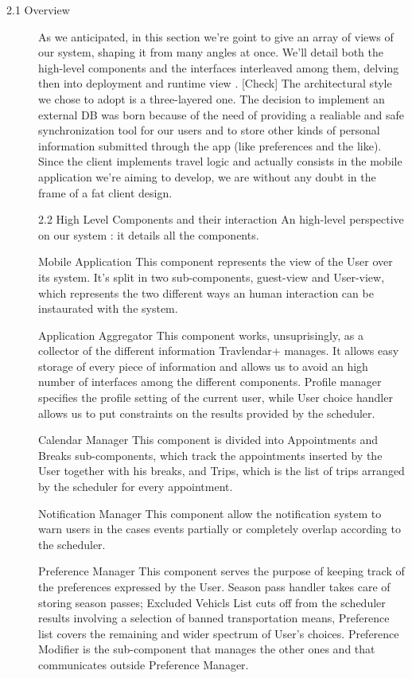 \documentclass[12pt, a4paper]{article}
\begin{document}
\begin{description}

\item[2.1 Overview]
As we anticipated, in this section we’re goint to give an array of views of our system, shaping it from many angles at once. We’ll detail both the high-level components and the interfaces interleaved among them, delving then into deployment and runtime view .
[Check] The architectural style we chose to adopt is a three-layered one.
The decision to implement an external DB was born because of the need of providing a realiable and safe synchronization tool for our users and to store other kinds of personal information submitted through the app (like preferences and the like).
Since the client implements travel logic and actually consists in the mobile application we’re aiming to develop, we are without any doubt in the frame of a fat client design.


2.2 High Level Components and their interaction
An high-level perspective on our system : it details all the components.


Mobile Application
This component represents the view of the User over its system. It’s split in two sub-components, guest-view and User-view, which represents the two different ways an human interaction can be instaurated with the system.

Application Aggregator
This component works, unsuprisingly, as a collector of the different information Travlendar+ manages. It allows easy storage of every piece of information and allows us to avoid an high number of interfaces among the different components. Profile manager specifies the profile setting of the current user, while User choice handler allows us to put constraints on the results provided by the scheduler.
 
Calendar Manager
This component is divided into Appointments and Breaks sub-components, which track the appointments inserted by the User together with his breaks, and Trips, which is the list of trips arranged by the scheduler for every appointment.

Notification Manager
This component allow the notification system to warn users in the cases events partially or completely overlap according to the scheduler.

Preference Manager
This component serves the purpose of keeping track of the preferences expressed by the User. Season pass handler takes care of storing season passes; Excluded Vehicls List cuts off from the scheduler results involving a selection of banned transportation means, Preference list covers the remaining and wider spectrum of User's choices.
Preference Modifier is the sub-component that manages the other ones and that communicates outside Preference Manager.


\end{description}
\end{document}
